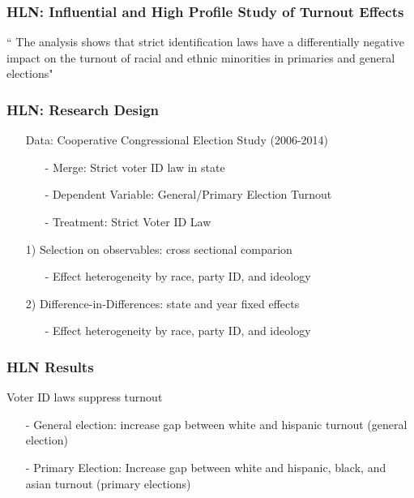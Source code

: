 \documentclass{beamer}
\numberwithin{equation}{section}
\begin{document}
\begin{frame}
\frametitle{HLN: Influential and High Profile Study of Turnout Effects}


\huge
`` The analysis shows that strict identification laws have a differentially
negative impact on the turnout of racial and ethnic minorities in primaries and general elections"

\end{frame}

\begin{frame}
\frametitle{HLN: Research Design}

\begin{itemize}
	\item[] \alert{Data}: Cooperative Congressional Election Study (2006-2014) 
		\begin{itemize}
			\item[-] Merge: Strict voter ID law in state
			\item[-] Dependent Variable: General/Primary Election Turnout
			\item[-] Treatment: Strict Voter ID Law
		\end{itemize}	
	\item[1)] Selection on observables: cross sectional comparion
	\begin{itemize}
	\item[-]  Effect heterogeneity by race, party ID, and ideology
\end{itemize}
	\item[2) ] Difference-in-Differences: state and year fixed effects 
	\begin{itemize}
	\item[-]  Effect heterogeneity by race, party ID, and ideology
\end{itemize}
\end{itemize}


\end{frame}


\begin{frame}
\frametitle{HLN Results} 
Voter ID laws suppress turnout 
\begin{itemize}
\item[-] General election:  increase gap between white and hispanic turnout (general election) 
\item[-] Primary Election: Increase gap between white and hispanic, black, and asian turnout (primary elections) 
\end{itemize}


\end{frame}
\end{document}
